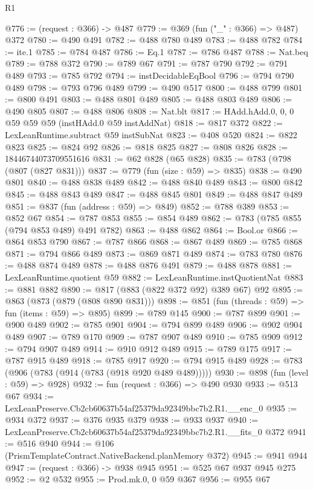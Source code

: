 \begin{lexlean}{R1}
\begin{coremodule}
@776 := (request : @366) -> @487
@779 := @369 (fun ("_" : @366) => @487) @372
@780 := @490 @491
@782 := @488 @780 @489
@783 := @488 @782
@784 := ite.{1}
@785 := @784 @487
@786 := Eq.{1}
@787 := @786 @487
@788 := Nat.beq
@789 := @788 @372
@790 := @789 @67
@791 := @787 @790
@792 := @791 @489
@793 := @785 @792
@794 := instDecidableEqBool
@796 := @794 @790 @489
@798 := @793 @796 @489
@799 := @490 @517
@800 := @488 @799
@801 := @800 @491
@803 := @488 @801 @489
@805 := @488 @803 @489
@806 := @490 @805
@807 := @488 @806
@808 := Nat.blt
@817 := HAdd.hAdd.{0, 0, 0} @59 @59 @59 (instHAdd.{0} @59 instAddNat)
@818 := @817 @372
@822 := LexLeanRuntime.subtract @59 instSubNat
@823 := @408 @520
@824 := @822 @823
@825 := @824 @92
@826 := @818 @825
@827 := @808 @826
@828 := 18446744073709551616
@831 := @62 @828 (@65 @828)
@835 := @783 (@798 (@807 (@827 @831)))
@837 := @779 (fun (size : @59) => @835)
@838 := @490 @801
@840 := @488 @838 @489
@842 := @488 @840 @489
@843 := @800 @842
@845 := @488 @843 @489
@847 := @488 @845 @801
@849 := @488 @847 @489
@851 := @837 (fun (address : @59) => @849)
@852 := @788 @389
@853 := @852 @67
@854 := @787 @853
@855 := @854 @489
@862 := @783 (@785 @855 (@794 @853 @489) @491 @782)
@863 := @488 @862
@864 := Bool.or
@866 := @864 @853 @790
@867 := @787 @866
@868 := @867 @489
@869 := @785 @868
@871 := @794 @866 @489
@873 := @869 @871 @489
@874 := @783 @780
@876 := @488 @874 @489
@878 := @488 @876 @491
@879 := @488 @878
@881 := LexLeanRuntime.quotient @59
@882 := LexLeanRuntime.instQuotientNat
@883 := @881 @882
@890 := @817 (@883 (@822 @372 @92) @389 @67) @92
@895 := @863 (@873 (@879 (@808 @890 @831)))
@898 := @851 (fun (threads : @59) => fun (items : @59) => @895)
@899 := @789 @145
@900 := @787 @899
@901 := @900 @489
@902 := @785 @901
@904 := @794 @899 @489
@906 := @902 @904 @489
@907 := @789 @170
@909 := @787 @907 @489
@910 := @785 @909
@912 := @794 @907 @489
@914 := @910 @912 @489
@915 := @789 @175
@917 := @787 @915 @489
@918 := @785 @917
@920 := @794 @915 @489
@928 := @783 (@906 (@783 (@914 (@783 (@918 @920 @489 @489)))))
@930 := @898 (fun (level : @59) => @928)
@932 := fun (request : @366) => @490 @930
@933 := @513 @67
@934 := LexLeanPreserve.Cb2cb60637b54af25379da92349bbc7b2.R1.__enc_0
@935 := @934 @372
@937 := @376 @935 @379
@938 := @933 @937
@940 := LexLeanPreserve.Cb2cb60637b54af25379da92349bbc7b2.R1.__fits_0 @372
@941 := @516 @940
@944 := @106 (PrismTemplateContract.NativeBackend.planMemory @372)
@945 := @941 @944
@947 := (request : @366) -> @938 @945
@951 := @525 @67 @937 @945 @275
@952 := @2 @532
@955 := Prod.mk.{0, 0} @59 @367
@956 := @955 @67

\end{coremodule}
\end{lexlean}
